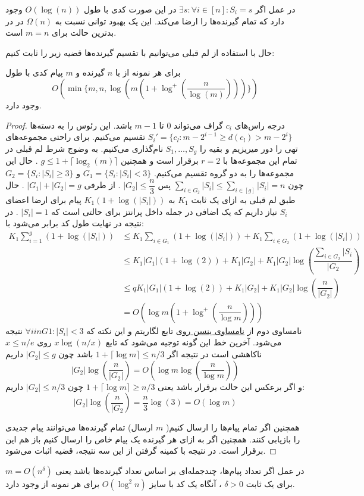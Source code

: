 \begin{remark}
	در عمل اگر 
	$\exists s: \forall i \in [n]: S_i = s$
	در این صورت کدی با طول
	$O(\log(n))$
	وجود دارد که تمام گیرنده‌ها را ارضا می‌کند. این یک بهبود توانی نسبت به
	$\Omega(n)$
	در
	\icod
	در بدترین حالت برای
	$m = n$
	است.
\end{remark}

حال با استفاده از لم قبلی می‌توانیم با تقسیم گیرنده‌ها قضیه زیر را ثابت کنیم:
\begin{theorem}
	\label{theorem:log1}
	برای هر نمونه از
	با
	$n$
	گیرنده و 
	$m$
	پیام کدی با طول
	$$O(\min\{m, n, \log(m(1 + \log^{+}(\dfrac{n}{\log(m)}) ))\})$$
	وجود دارد.
\end{theorem}
\begin{proof}
	درجه راس‌های 
	$c_i$
	گراف می‌تواند
	$0$
	تا
	$m - 1$
	باشد. این رئوس را به دسته‌ها
	$S_{i}' = \{c_l: m - 2^{i - 1} \geq d(c_l) > m -  2^i\}$
	تقسیم می‌کنیم. برای راحتی مجموعه‌های تهی را دور میریزیم و بقیه را
	$S_1, \ldots, S_g$
	نام‌گذاری می‌کنیم. به وضوج شرط لم قبلی در تمام این مجموعه‌ها با
	$r = 2$
	برقرار است و همچنین
	$g \leq 1 + \lceil\log_2(m)\rceil$
	. حال این مجموعه‌ها را به دو گروه تقسیم می‌کنیم.
	$G_1 = \{ S_i: |S_i| < 3\}$
	و 
	$G_2 = \{ S_i: |S_i| \geq 3\}$
	چون
	$\sum_{i \in G_2} |S_i| \leq \sum_{i \in [g]} |S_i| = n$
	پس
	$|G_2| \leq \dfrac{n}{3}$
	. از طرفی
	$|G_1| + |G_2| = g$
	. حال طبق لم قبلی به ازای یک ثابت
	$K_1$
	به
	$K_1(1 + \log(|S_i|))$
	پیام برای ارضا اعضای
	$S_i$
	نیاز داریم که یک اضافی در جمله داخل پرانتز برای حالتی است که
	$|S_i| = 1$
	. در نتیجه در نهایت طول کد برابر می‌شود با:
	\begin{align}
		K_1 \sum\limits_{i = 1}^{g} (1 + \log(|S_i|)) 
		& \leq K_1 \sum_{i \in G_1}	(1 + \log(|S_i|)) + K_1 \sum_{i \in G_2} (1 + \log(|S_i|)) \\
		& \leq K_1 |G_1| (1 + \log(2)) + K_1 |G_2| + K_1 |G_2| \log(\dfrac{\sum_{i\in G_2} |S_i}{|G_2}) \\
		& \leq q K_1 |G_1| (1 + \log(2)) + K_1 |G_2| + K_1 |G_2| \log(\dfrac{n}{|G_2|}) \\
		& = O(\log m (1 + \log^{+}(\dfrac{n}{\log m})))
	\end{align}
	نامساوی دوم از 
	\hyperref[Jensen]{
		نامساوی ینسن
	}
	روی تابع لگاریتم و این نکته که
	$\forall i in G1: |S_i| < 3$
	نتیجه می‌شود. آخرین خط این گونه توجیه می‌شود که تابع
	$x \log(n/x)$
	روی
	$x \leq n/e$
	ناکاهشی است در نتیجه اگر
	$1 + \lceil \log m \rceil \leq n/3$
	باشد چون
	$|G_2| \leq g$
	داریم
	$$|G_2| \log (\dfrac{n}{|G_2|}) = O(\log m \log (\dfrac{n}{\log m}))$$
	و اگر برعکس این حالت برقرار باشد یعنی
	$1 + \lceil \log m \rceil \ge n/3$
	چون 
	$|G_2| \leq n/3$
	داریم:
	$$|G_2| \log(\dfrac{n}{|G_2}) = \dfrac{n}{3} \log(3) = O(\log m)$$
	
	همچنین اگر تمام پیام‌ها را ارسال کنیم(
	$m$
	ارسال) تمام گیرنده‌ها می‌توانند پیام جدیدی را بازیابی کنند. همچنین اگر به ازای هر گیرنده یک پیام خاص را ارسال کنیم باز هم این برقرار است. در نتیجه با کمینه گرفتن از این سه نتیجه، قضیه اثبات می‌شود.
\end{proof}
در عمل اگر تعداد پیام‌ها، چندجمله‌ای بر اساس تعداد گیرنده‌ها باشد یعنی
$m = O(n^{\delta})$
برای یک ثابت
$\delta > 0$
، آنگاه یک کد با سایز
$O(\log^2 n)$
برای هر نمونه از
وجود دارد.

